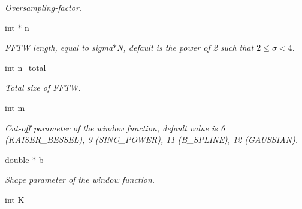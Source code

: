 \begin{CompactItemize}
\begin{CompactList}\small\item\em Oversampling-factor. \item\end{CompactList}\item 
\hypertarget{structnfft__plan_a8db04bb03357b831a1958f9a802e0ae}{
int $\ast$ \hyperlink{structnfft__plan_a8db04bb03357b831a1958f9a802e0ae}{n}}
\label{structnfft__plan_a8db04bb03357b831a1958f9a802e0ae}

\begin{CompactList}\small\item\em FFTW length, equal to sigma$\ast$N, default is the power of 2 such that $2\le\sigma<4$. \item\end{CompactList}\item 
\hypertarget{structnfft__plan_d8a5fdac5bcf62d86479c800768fdeb7}{
int \hyperlink{structnfft__plan_d8a5fdac5bcf62d86479c800768fdeb7}{n\_\-total}}
\label{structnfft__plan_d8a5fdac5bcf62d86479c800768fdeb7}

\begin{CompactList}\small\item\em Total size of FFTW. \item\end{CompactList}\item 
\hypertarget{structnfft__plan_dbac137859fb87be7be73a5443de8cef}{
int \hyperlink{structnfft__plan_dbac137859fb87be7be73a5443de8cef}{m}}
\label{structnfft__plan_dbac137859fb87be7be73a5443de8cef}

\begin{CompactList}\small\item\em Cut-off parameter of the window function, default value is 6 (KAISER\_\-BESSEL), 9 (SINC\_\-POWER), 11 (B\_\-SPLINE), 12 (GAUSSIAN). \item\end{CompactList}\item 
\hypertarget{structnfft__plan_724949f4916b28f484eb447ee1a77f0a}{
double $\ast$ \hyperlink{structnfft__plan_724949f4916b28f484eb447ee1a77f0a}{b}}
\label{structnfft__plan_724949f4916b28f484eb447ee1a77f0a}

\begin{CompactList}\small\item\em Shape parameter of the window function. \item\end{CompactList}\item 
\hypertarget{structnfft__plan_0b3735bcdd415a86126e0c86d47941a4}{
int \hyperlink{structnfft__plan_0b3735bcdd415a86126e0c86d47941a4}{K}}
\label{structnfft__plan_0b3735bcdd415a86126e0c86d47941a4}


\end{CompactItemize}
